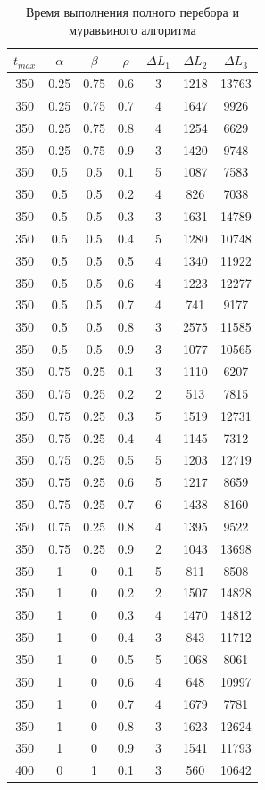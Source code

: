 \documentclass[a4paper,oneside,14pt]{extreport}
\begin{document}
\begin{table}[H]
\begin{center}
	\caption[]{\label{tbl:only} Время выполнения полного перебора и муравьиного алгоритма}
	\begin{tabular}{|c|c|c|c|c|c|c|}
		\hline
		$t_{max}$ & $\alpha$ & $\beta$ & $\rho$ & $\Delta L_{1}$ & $\Delta L_{2}$ & $\Delta L_{3}$\\
		\hline
		350 & 0.25 & 0.75 & 0.6 & 3 & 1218 & 13763 \\
		350 & 0.25 & 0.75 & 0.7 & 4 & 1647 & 9926 \\
		350 & 0.25 & 0.75 & 0.8 & 4 & 1254 & 6629 \\
		350 & 0.25 & 0.75 & 0.9 & 3 & 1420 & 9748 \\
		350 & 0.5 & 0.5 & 0.1 & 5 & 1087 & 7583 \\
		350 & 0.5 & 0.5 & 0.2 & 4 & 826 & 7038 \\
		350 & 0.5 & 0.5 & 0.3 & 3 & 1631 & 14789 \\
		350 & 0.5 & 0.5 & 0.4 & 5 & 1280 & 10748 \\
		350 & 0.5 & 0.5 & 0.5 & 4 & 1340 & 11922 \\
		350 & 0.5 & 0.5 & 0.6 & 4 & 1223 & 12277 \\
		350 & 0.5 & 0.5 & 0.7 & 4 & 741 & 9177 \\
		350 & 0.5 & 0.5 & 0.8 & 3 & 2575 & 11585 \\
		350 & 0.5 & 0.5 & 0.9 & 3 & 1077 & 10565 \\
		350 & 0.75 & 0.25 & 0.1 & 3 & 1110 & 6207 \\
		350 & 0.75 & 0.25 & 0.2 & 2 & 513 & 7815 \\
		350 & 0.75 & 0.25 & 0.3 & 5 & 1519 & 12731 \\
		350 & 0.75 & 0.25 & 0.4 & 4 & 1145 & 7312 \\
		350 & 0.75 & 0.25 & 0.5 & 5 & 1203 & 12719 \\
		350 & 0.75 & 0.25 & 0.6 & 5 & 1217 & 8659 \\
		350 & 0.75 & 0.25 & 0.7 & 6 & 1438 & 8160 \\
		350 & 0.75 & 0.25 & 0.8 & 4 & 1395 & 9522 \\
		350 & 0.75 & 0.25 & 0.9 & 2 & 1043 & 13698 \\
		350 & 1 & 0 & 0.1 & 5 & 811 & 8508 \\
		350 & 1 & 0 & 0.2 & 2 & 1507 & 14828 \\
		350 & 1 & 0 & 0.3 & 4 & 1470 & 14812 \\
		350 & 1 & 0 & 0.4 & 3 & 843 & 11712 \\
		350 & 1 & 0 & 0.5 & 5 & 1068 & 8061 \\
		350 & 1 & 0 & 0.6 & 4 & 648 & 10997 \\
		350 & 1 & 0 & 0.7 & 4 & 1679 & 7781 \\
		350 & 1 & 0 & 0.8 & 3 & 1623 & 12624 \\
		350 & 1 & 0 & 0.9 & 3 & 1541 & 11793 \\
		400 & 0 & 1 & 0.1 & 3 & 560 & 10642 \\
		\hline 	
	\end{tabular}
\end{center}
\end{table}
\end{document}
